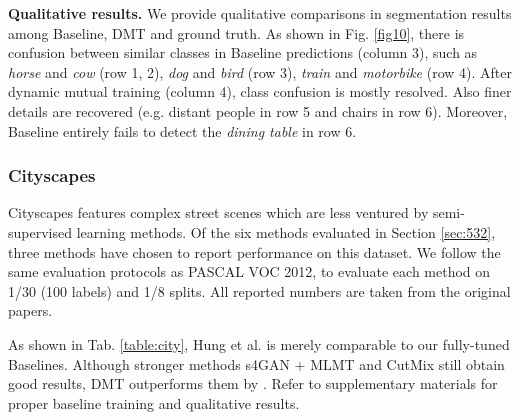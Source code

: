 \documentclass[preprint,review,10pt]{elsarticle}
\begin{document}
\textbf{Qualitative results.} We provide qualitative comparisons in segmentation results among Baseline, DMT and ground truth. As shown in Fig. \ref{fig10}, there is confusion between similar classes in Baseline predictions (column 3), such as \textit{horse} and \textit{cow} (row 1, 2), \textit{dog} and \textit{bird} (row 3), \textit{train} and \textit{motorbike} (row 4). After dynamic mutual training (column 4), class confusion is mostly resolved. Also finer details are recovered (e.g. distant people in row 5 and chairs in row 6). Moreover, Baseline entirely fails to detect the \textit{dining table} in row 6.

\subsubsection{Cityscapes}
\label{sec:533}

Cityscapes features complex street scenes which are less ventured by semi-supervised learning methods. Of the six methods evaluated in Section \ref{sec:532}, three methods have chosen to report performance on this dataset. We follow the same evaluation protocols as PASCAL VOC 2012, to evaluate each method on 1/30 (100 labels) and 1/8 splits. All reported numbers are taken from the original papers.

As shown in Tab. \ref{table:city}, Hung et al. \cite{hung} is merely comparable to our fully-tuned Baselines. Although stronger methods s4GAN + MLMT \cite{mittal2019semi} and CutMix \cite{french2019semisupervised} still obtain good results, DMT outperforms them by . Refer to supplementary materials for proper baseline training and qualitative results.







\begin{table}[t]
\caption{Mean IoU () results for DMT and other methods on Cityscapes \textit{val} set. Performance gap to Oracle is shown in brackets. \textit{* ImageNet pre-training.}}
\label{table:city}
\centering
{}
\end{table}
\end{document}
